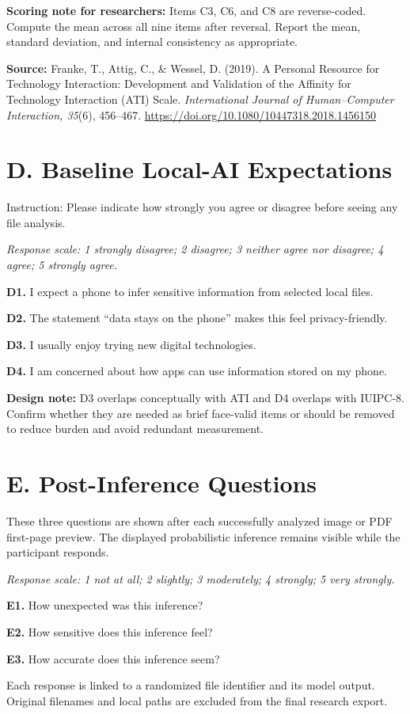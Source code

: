 \documentclass[10pt,a4paper]{article}
\newcommand{\scale}[1]{\textit{Response scale: #1}}
\newcommand{\qitem}[2]{\textbf{#1} #2\par}
\begin{document}
\textbf{Scoring note for researchers:} Items C3, C6, and C8 are reverse-coded. Compute the mean across all nine items after reversal. Report the mean, standard deviation, and internal consistency as appropriate.

\textbf{Source:} Franke, T., Attig, C., \& Wessel, D. (2019). A Personal Resource for Technology Interaction: Development and Validation of the Affinity for Technology Interaction (ATI) Scale. \textit{International Journal of Human--Computer Interaction, 35}(6), 456--467. \url{https://doi.org/10.1080/10447318.2018.1456150}

\section*{D. Baseline Local-AI Expectations}

Instruction: Please indicate how strongly you agree or disagree before seeing any file analysis.

\scale{1 strongly disagree; 2 disagree; 3 neither agree nor disagree; 4 agree; 5 strongly agree.}

\qitem{D1.}{I expect a phone to infer sensitive information from selected local files.}
\qitem{D2.}{The statement ``data stays on the phone'' makes this feel privacy-friendly.}
\qitem{D3.}{I usually enjoy trying new digital technologies.}
\qitem{D4.}{I am concerned about how apps can use information stored on my phone.}

\textbf{Design note:} D3 overlaps conceptually with ATI and D4 overlaps with IUIPC-8. Confirm whether they are needed as brief face-valid items or should be removed to reduce burden and avoid redundant measurement.

\section*{E. Post-Inference Questions}

These three questions are shown after each successfully analyzed image or PDF first-page preview. The displayed probabilistic inference remains visible while the participant responds.

\scale{1 not at all; 2 slightly; 3 moderately; 4 strongly; 5 very strongly.}

\qitem{E1.}{How unexpected was this inference?}
\qitem{E2.}{How sensitive does this inference feel?}
\qitem{E3.}{How accurate does this inference seem?}

Each response is linked to a randomized file identifier and its model output. Original filenames and local paths are excluded from the final research export.
\end{document}
